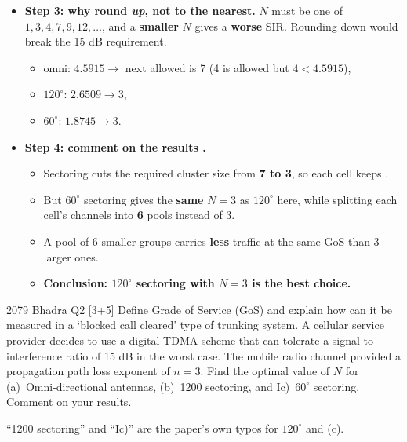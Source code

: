 \begin{itemize}
  \item \textbf{Step 3: why round \emph{up}, not to the nearest.}
        $N$ must be one of $1,3,4,7,9,12,\dots$, and a \textbf{smaller} $N$ gives a
        \textbf{worse} SIR. Rounding down would break the 15 dB requirement.
  \begin{itemize}
    \item omni: $4.5915 \rightarrow$ next allowed is 7 (4 is allowed but $4 < 4.5915$),
    \item $120^\circ$: $2.6509 \rightarrow 3$,
    \item $60^\circ$: $1.8745 \rightarrow 3$.
  \end{itemize}
  \item \textbf{Step 4: comment on the results .}
  \begin{itemize}
    \item Sectoring cuts the required cluster size from \textbf{7 to 3}, so each cell keeps
          .
    \item But $60^\circ$ sectoring gives the \textbf{same} $N=3$ as $120^\circ$ here, while
          splitting each cell's channels into \textbf{6} pools instead of 3.
    \item A pool of 6 smaller groups carries \textbf{less} traffic at the same GoS than 3 larger
          ones. 
    \item \textbf{Conclusion: $120^\circ$ sectoring with $N=3$ is the best choice.}
  \end{itemize}
\end{itemize}

\begin{asked}{2079 Bhadra \textperiodcentered{} Q2 \textperiodcentered{} [3+5]}
Define Grade of Service (GoS) and explain how can it be measured in a `blocked call cleared'
type of trunking system. A cellular service provider decides to use a digital TDMA scheme that
can tolerate a signal-to-interference ratio of 15 dB in the worst case. The mobile radio
channel provided a propagation path loss exponent of $n = 3$. Find the optimal value of $N$ for
(a)~Omni-directional antennas, (b)~1200 sectoring, and Ic)~$60^\circ$ sectoring. Comment on
your results.
\par\vspace{1pt}
{\color{sub}``1200 sectoring'' and ``Ic)'' are the paper's own typos for $120^\circ$ and (c).}
\end{asked}


